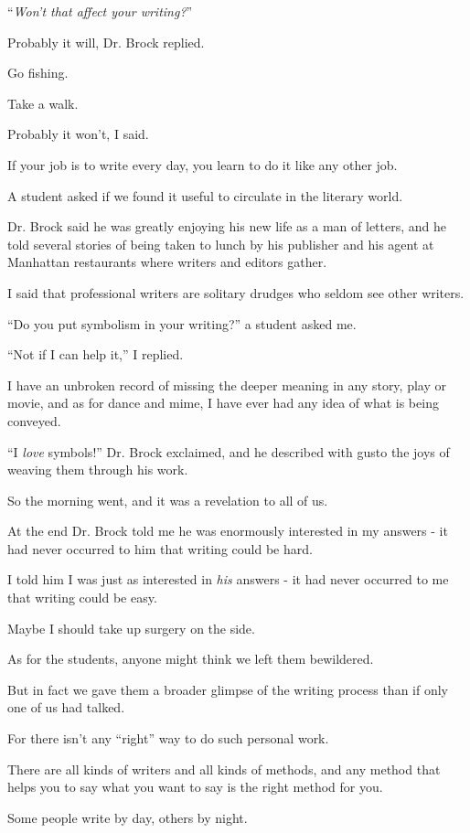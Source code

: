 \documentclass{book}
\numberwithin{equation}{section}
\begin{document}
``\textit{Won't that affect your writing?}''

Probably it will, Dr. Brock replied.

Go fishing.

Take a walk.

Probably it won't, I said.

If your job is to write every day, you learn to do it like any other job.

%
A student asked if we found it useful to circulate in the literary world.

Dr. Brock said he was greatly enjoying his new life as a man of letters, and he told several stories of being taken to lunch by his publisher and his agent at Manhattan restaurants where writers and editors gather.

I said that professional writers are solitary drudges who seldom see other writers.

``Do you put symbolism in your writing?'' a student asked me.

``Not if I can help it,'' I replied.

I have an unbroken record of missing the deeper meaning in any story, play or movie, and as for dance and mime, I have ever had any idea of what is being conveyed.

%
``I \textit{love} symbols!'' Dr. Brock exclaimed, and he described with gusto the joys of weaving them through his work.

%
So the morning went, and it was a revelation to all of us.

At the end Dr. Brock told me he was enormously interested in my answers - it had never occurred to him that writing could be hard.

I told him I was just as interested in \textit{his} answers - it had never occurred to me that writing could be easy.

Maybe I should take up surgery on the side.

%
As for the students, anyone might think we left them bewildered.

But in fact we gave them a broader glimpse of the writing process than if only one of us had talked.

For there isn't any ``right'' way to do such personal work.

There are all kinds of writers and all kinds of methods, and any method that helps you to say what you want to say is the right method for you.

Some people write by day, others by night.
\end{document}
